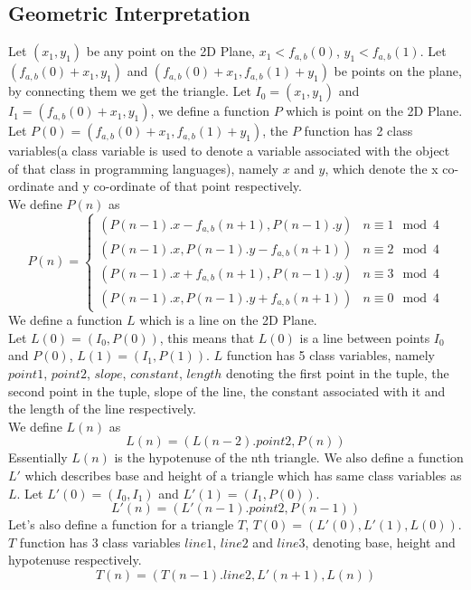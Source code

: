 \documentclass[preprint,12pt]{elsarticle}
\begin{document}
\subsection{Geometric Interpretation}
\label{geo}
Let $(x_1, y_1)$ be any point on the 2D Plane, $x_1 < f_{a,b}(0)$, $y_1 < f_{a,b}(1)$. Let $(f_{a,b}(0) + x_1, y_1)$ and $(f_{a,b}(0) + x_1, f_{a,b}(1) + y_1)$ be points on the plane, by connecting them we get the triangle.
Let $I_0 = (x_1, y_1)$ and $I_1 = (f_{a,b}(0) + x_1, y_1)$, we define a function $P$ which is point on the 2D Plane.\\
Let $P(0) = (f_{a,b}(0) + x_1, f_{a,b}(1) + y_1)$, the $P$ function has 2 class variables(a class variable is used to denote a variable associated with the object of that class in programming languages), namely $x$ and $y$, which denote the x co-ordinate and y co-ordinate of that point respectively.\\
We define $P(n)$ as
\begin{equation*}
P(n) = \begin{cases}
(P(n - 1).x - f_{a,b}(n + 1), P(n - 1).y) & n \equiv 1\mod 4\\
(P(n - 1).x, P(n - 1).y - f_{a,b}(n + 1)) & n \equiv 2\mod 4\\
(P(n - 1).x + f_{a,b}(n + 1), P(n - 1).y) & n \equiv 3\mod 4\\
(P(n - 1).x, P(n - 1).y + f_{a,b}(n + 1)) & n \equiv 0\mod 4
\end{cases}
\end{equation*}
We define a function $L$ which is a line on the 2D Plane.\\
Let $L(0) = (I_0, P(0))$, this means that $L(0)$ is a line between points $I_0$ and $P(0)$, $L(1) = (I_1, P(1))$. $L$ function has 5 class variables, namely $point1$, $point2$, $slope$, $constant$, $length$ denoting the first point in the tuple, the second point in the tuple, slope of the line, the constant associated with it and the length of the line respectively.\\
We define $L(n)$ as $$L(n) = (L(n - 2).point2, P(n))$$ 
Essentially $L(n)$ is the hypotenuse of the nth triangle.
We also define a function $L'$ which describes base and height of a triangle which has same class variables as $L$.
Let $L'(0) = (I_0, I_1)$ and $L'(1) = (I_1, P(0))$.
$$L'(n) = (L'(n - 1).point2, P(n - 1))$$
Let's also define a function for a triangle $T$, $T(0) = (L'(0), L'(1), L(0))$. $T$ function has 3 class variables $line1$, $line2$ and $line3$, denoting base, height and hypotenuse respectively.
$$T(n) = (T(n - 1).line2, L'(n + 1), L(n))$$
\end{document}
